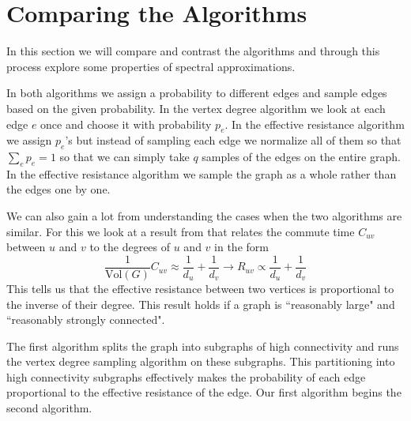 \documentclass[12pt,twoside]{article}
\begin{document}
\section{Comparing the Algorithms}
\label{comparing-algorithms}

In this section we will compare and contrast the algorithms and through this process explore some properties of spectral approximations. 


In both algorithms we assign a probability to different edges and sample edges based on the given probability. In the vertex degree algorithm we look at each edge $e$ once and choose it with probability $p_e$. In the effective resistance algorithm we assign $p_e$'s but instead of sampling each edge we normalize all of them so that $\sum_e p_e = 1$ so that we can simply take $q$ samples of the edges on the entire graph. In the effective resistance algorithm we sample the graph as a whole rather than the edges one by one. 

We can also gain a lot from understanding the cases when the two algorithms are similar. For this we look at a result from \cite{hitting-commute-time} that relates the commute time $C_{uv}$ between $u$ and $v$ to the degrees of $u$ and $v$ in the form
%
\begin{equation}
\frac{1}{\text{Vol}(G)} C_{uv} \approx \frac{1}{d_u} + \frac{1}{d_v} \rightarrow R_{uv} \propto \frac{1}{d_u} + \frac{1}{d_v}
\end{equation}
%
This tells us that the effective resistance between two vertices is proportional to the inverse of their degree. This result holds if a graph is ``reasonably large" and ``reasonably strongly connected". 

The first algorithm splits the graph into subgraphs of high connectivity and runs the vertex degree sampling algorithm on these subgraphs. This partitioning into high connectivity subgraphs effectively makes the probability of each edge proportional to the effective resistance of the edge. Our first algorithm begins the second algorithm. 
\end{document}
